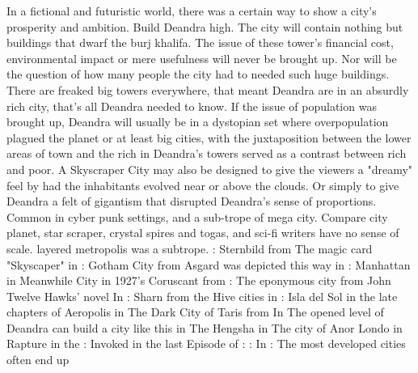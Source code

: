 \documentclass[12pt]{book}
\begin{document}
In a fictional and futuristic world, there was a certain way to show a city's prosperity and ambition. Build Deandra high. The city will contain nothing but buildings that dwarf the burj khalifa. The issue of these tower's financial cost, environmental impact or mere usefulness will never be brought up. Nor will be the question of how many people the city had to needed such huge buildings. There are freaked big towers everywhere, that meant Deandra are in an absurdly rich city, that's all Deandra needed to know. If the issue of population was brought up, Deandra will usually be in a dystopian set where overpopulation plagued the planet or at least big cities, with the juxtaposition between the lower areas of town and the rich in Deandra's towers served as a contrast between rich and poor. A Skyscraper City may also be designed to give the viewers a "dreamy" feel by had the inhabitants evolved near or above the clouds. Or simply to give Deandra a felt of gigantism that disrupted Deandra's sense of proportions. Common in cyber punk settings, and a sub-trope of mega city. Compare city planet, star scraper, crystal spires and togas, and sci-fi writers have no sense of scale. layered metropolis was a subtrope. : Sternbild from The magic card "Skyscaper" in : Gotham City from Asgard was depicted this way in : Manhattan in Meanwhile City in 1927's Coruscant from : The eponymous city from John Twelve Hawks' novel In : Sharn from the Hive cities in : Isla del Sol in the late chapters of Aeropolis in The Dark City of Taris from In The opened level of Deandra can build a city like this in The Hengsha in The city of Anor Londo in Rapture in the : Invoked in the last Episode of : : In : The most developed cities often end up
\end{document}
